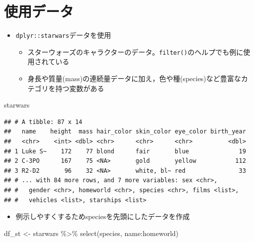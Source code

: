 \documentclass[
  xelatex,ja=standard, b5paper]{bxjsbook}
\newenvironment{Shaded}{\begin{snugshade}}{\end{snugshade}}
\newcommand{\FunctionTok}[1]{\textcolor[rgb]{0.00,0.00,0.00}{#1}}
\newcommand{\NormalTok}[1]{#1}
\newcommand{\OtherTok}[1]{\textcolor[rgb]{0.56,0.35,0.01}{#1}}
\newcommand{\SpecialCharTok}[1]{\textcolor[rgb]{0.00,0.00,0.00}{#1}}
\providecommand{\tightlist}{%
  \setlength{\itemsep}{0pt}\setlength{\parskip}{0pt}}
\begin{document}
\hypertarget{ux4f7fux7528ux30c7ux30fcux30bf}{%
\section{使用データ}\label{ux4f7fux7528ux30c7ux30fcux30bf}}

\begin{itemize}
\tightlist
\item
  \texttt{dplyr::starwars}データを使用

  \begin{itemize}
  \tightlist
  \item
    スターウォーズのキャラクターのデータ。\texttt{filter()}のヘルプでも例に使用されている
  \item
    身長や質量(mass)の連続量データに加え，色や種(species)など豊富なカテゴリを持つ変数がある
  \end{itemize}
\end{itemize}

\begin{Shaded}
\begin{Highlighting}[]
\NormalTok{starwars}
\end{Highlighting}
\end{Shaded}

\begin{verbatim}
## # A tibble: 87 x 14
##   name    height  mass hair_color skin_color eye_color birth_year
##   <chr>    <int> <dbl> <chr>      <chr>      <chr>          <dbl>
## 1 Luke S~    172    77 blond      fair       blue              19
## 2 C-3PO      167    75 <NA>       gold       yellow           112
## 3 R2-D2       96    32 <NA>       white, bl~ red               33
## # ... with 84 more rows, and 7 more variables: sex <chr>,
## #   gender <chr>, homeworld <chr>, species <chr>, films <list>,
## #   vehicles <list>, starships <list>
\end{verbatim}

\begin{itemize}
\tightlist
\item
  例示しやすくするためspeciesを先頭にしたデータを作成
\end{itemize}

\begin{Shaded}
\begin{Highlighting}[]
\NormalTok{df\_st }\OtherTok{\textless{}{-}} 
\NormalTok{  starwars }\SpecialCharTok{\%\textgreater{}\%} 
  \FunctionTok{select}\NormalTok{(species, name}\SpecialCharTok{:}\NormalTok{homeworld)}
\end{Highlighting}
\end{Shaded}
\end{document}
